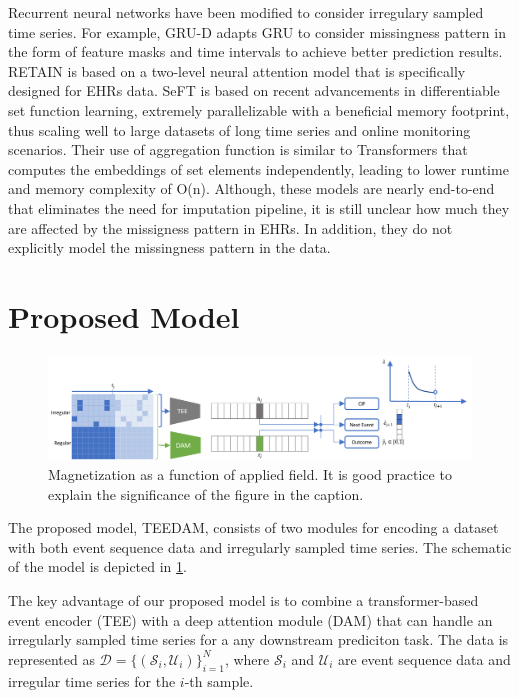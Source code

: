 \documentclass[journal,twoside,web]{ieeecolor}
\begin{document}
Recurrent neural networks have been modified to consider irregulary sampled time series. For example, GRU-D \cite*{cheRecurrentNeuralNetworks2018} adapts GRU to consider missingness pattern in the form of feature masks and time intervals to achieve better prediction results. RETAIN \cite*{choiRETAINInterpretablePredictive2017} is based on a two-level neural attention model that is specifically designed for EHRs data. SeFT \cite*{hornSetFunctionsTime2020} is based on recent advancements in differentiable set function learning, extremely parallelizable with a beneficial memory footprint, thus scaling well to large datasets of long time series and online monitoring scenarios. Their use of aggregation function is similar to Transformers that computes the embeddings of set elements independently, leading to lower runtime and memory complexity of O(n). Although, these models are nearly end-to-end that eliminates the need for imputation pipeline, it is still unclear how much they are affected by the missigness pattern in EHRs. In addition, they do not explicitly model the missingness pattern in the data.






\section{Proposed Model}
\label{sec:Proposed Model}


\begin{figure}[!t]
\centerline{\includegraphics{images/model_arch.png}}
\caption{Magnetization as a function of applied field.
It is good practice to explain the significance of the figure in the caption.}
\label{fig1}
\end{figure}

The proposed model, TEEDAM, consists of two modules for encoding a dataset with both event sequence data and irregularly sampled time series. The schematic of the model is depicted in \ref*{fig1}.

 The key advantage of our proposed model is to combine a transformer-based event encoder (TEE) with a deep attention module (DAM) that can handle an irregularly sampled time series for a any downstream prediciton task. The data is represented as $\mathcal{D}=\{(\mathcal{S}_i,\mathcal{U}_i)\}_{i=1}^{N}$, where $\mathcal{S}_i$ and $\mathcal{U}_i$ are event sequence data and irregular time series for the $i$-th sample.
\end{document}
